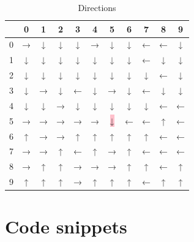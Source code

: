 \documentclass[a4paper, 11pt, twocolumn, final]{article} %
\begin{document}
\begin{table}[H]
  \centering
  \begin{tabular}{r | c c c c c c c c c c}
    \hline
      & 0 & 1 & 2 & 3 & 4 & 5 & 6 & 7 & 8 & 9 \\
    \hline
    0 & → & ↓ & ↓ & ↓ & → & ↓ & ↓ & ← & ← & ↓ \\
    1 & ↓ & ↓ & ↓ & ↓ & ↓ & ↓ & ↓ & ← & ↓ & ↓ \\
    2 & ↓ & ↓ & ↓ & ↓ & ↓ & ↓ & ↓ & ↓ & ← & ↓ \\
    3 & ↓ & → & ↓ & ← & ↓ & → & ↓ & ← & ↓ & ↓ \\
    4 & ↓ & ↓ & → & ↓ & ↓ & ↓ & ↓ & ↓ & ← & ← \\
    5 & → & → & → & → & → & \colorbox{pink}{↓} & ← & ← & ↑ & ← \\
    6 & ↑ & → & → & ↑ & ↑ & ↑ & ↑ & ↑ & ← & ← \\
    7 & → & → & ↑ & ← & ↑ & → & ↑ & ← & ← & ← \\
    8 & → & ↑ & ↑ & → & → & → & ↑ & ↑ & ← & ↑ \\
    9 & ↑ & ↑ & ↑ & → & ↑ & ↑ & ↑ & ← & ↑ & ↑ \\
    \hline
  \end{tabular}
  \caption{Directions}
  \label{tab:computed_directions}
\end{table}

\section{Code snippets} \label{sec:code}
\end{document}
